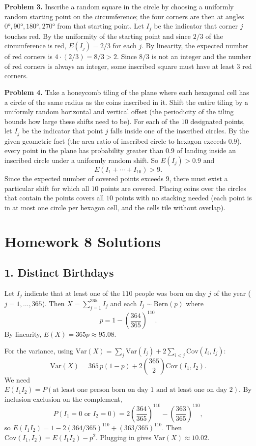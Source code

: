 \documentclass{article}
\begin{document}
\bigskip
\textbf{Problem 3.} Inscribe a random square in the circle by choosing a uniformly random starting point on the circumference; the four corners are then at angles $0°, 90°, 180°, 270°$ from that starting point. Let $I_j$ be the indicator that corner $j$ touches red. By the uniformity of the starting point and since $2/3$ of the circumference is red, $E(I_j)=2/3$ for each $j$. By linearity, the expected number of red corners is $4\cdot(2/3)=8/3>2$. Since $8/3$ is not an integer and the number of red corners is always an integer, some inscribed square must have at least $3$ red corners.

\bigskip
\textbf{Problem 4.} Take a honeycomb tiling of the plane where each hexagonal cell has a circle of the same radius as the coins inscribed in it. Shift the entire tiling by a uniformly random horizontal and vertical offset (the periodicity of the tiling bounds how large these shifts need to be). For each of the $10$ designated points, let $I_j$ be the indicator that point $j$ falls inside one of the inscribed circles. By the given geometric fact (the area ratio of inscribed circle to hexagon exceeds $0.9$), every point in the plane has probability greater than $0.9$ of landing inside an inscribed circle under a uniformly random shift. So $E(I_j)>0.9$ and
$$
E(I_1+\cdots+I_{10}) > 9.
$$
Since the expected number of covered points exceeds $9$, there must exist a particular shift for which all $10$ points are covered. Placing coins over the circles that contain the points covers all $10$ points with no stacking needed (each point is in at most one circle per hexagon cell, and the cells tile without overlap).

\bigskip
\section*{Homework 8 Solutions}

\subsection*{1. Distinct Birthdays}

Let $I_j$ indicate that at least one of the $110$ people was born on day $j$ of the year ($j=1,\dots,365$). Then $X=\sum_{j=1}^{365}I_j$ and each $I_j\sim\text{Bern}(p)$ where
$$
p = 1-\left(\frac{364}{365}\right)^{110}.
$$
By linearity, $E(X)=365p\approx95.08$.

For the variance, using $\text{Var}(X)=\sum_j\text{Var}(I_j)+2\sum_{i<j}\text{Cov}(I_i,I_j)$:
$$
\text{Var}(X) = 365\,p(1-p) + 2\binom{365}{2}\text{Cov}(I_1,I_2).
$$
We need $E(I_1 I_2)=P(\text{at least one person born on day 1 and at least one on day 2})$. By inclusion-exclusion on the complement,
$$
P(I_1=0\text{ or }I_2=0) = 2\left(\frac{364}{365}\right)^{110}-\left(\frac{363}{365}\right)^{110},
$$
so $E(I_1 I_2)=1-2(364/365)^{110}+(363/365)^{110}$. Then $\text{Cov}(I_1,I_2)=E(I_1I_2)-p^2$. Plugging in gives $\text{Var}(X)\approx10.02$.
\end{document}
